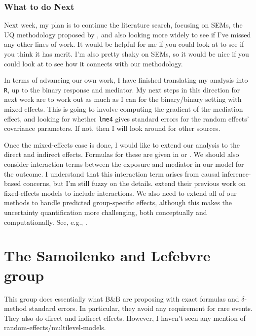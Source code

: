 \documentclass{article}
\begin{document}
\subsubsection{What to do Next}

Next week, my plan is to continue the literature search, focusing on SEMs, the UQ methodology proposed by \citet{Zhe21}, and also looking more widely to see if I've missed any other lines of work. It would be helpful for me if you could look at \citet{Zhe21} to see if you think it has merit. I'm also pretty shaky on SEMs, so it would be nice if you could look at \citet{Zig19} to see how it connects with our methodology.

In terms of advancing our own work, I have finished translating my analysis into \texttt{R}, up to the binary response and mediator. My next steps in this direction for next week are to work out as much as I can for the binary/binary setting with mixed effects. This is going to involve computing the gradient of the mediation effect, and looking for whether \texttt{lme4} gives standard errors for the random effects' covariance parameters. If not, then I will look around for other sources.

Once the mixed-effects case is done, I would like to extend our analysis to the direct and indirect effects. Formulas for these are given in \citet{Sam18} or \citet{Che21}. We should also consider interaction terms between the exposure and mediator in our model for the outcome. I understand that this interaction term arises from causal inference-based concerns, but I'm still fuzzy on the details. \citet{Sam21} extend their previous work on fixed-effects models to include interactions. We also need to extend all of our methods to handle predicted group-specific effects, although this makes the uncertainty quantification more challenging, both conceptually and computationally. See, e.g., \citet{Boo98,Flo19,Zig19}.






\section{The Samoilenko and Lefebvre group}
\label{sec:Sam}

This group does essentially what B\&B are proposing with exact formulas and $\delta$-method standard errors. In particular, they avoid any requirement for rare events. They also do direct and indirect effects. However, I haven't seen any mention of random-effects/multilevel-models.
\end{document}
